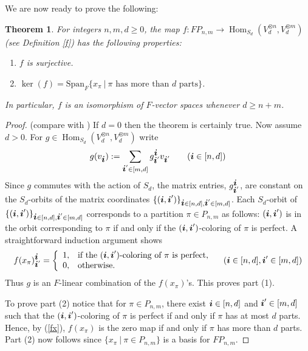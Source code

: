 \documentclass{amsart}
\def\bd#1{\mbox{\boldmath${#1}$}}
\newtheorem{theorem}{Theorem}[section]
\theoremstyle{definition}
\newcommand{\Hom}{\operatorname{Hom}}
\renewcommand{\1}{_{(1)}}
\renewcommand{\2}{_{(2)}}
\newcommand{\3}{_{(3)}}
\newcommand{\4}{_{(4)}}
\begin{document}
We are now ready to prove the following:

\begin{theorem}\label{sw}  For integers $n, m, d\geq 0$, the map $f: F P_{n,m}\to\Hom_{S_d}(V_d^{\otimes n}, V_d^{\otimes m})$ (see Definition \ref{f}) has the following properties:
\begin{enumerate}
\item[(1)] $f$ is surjective.

\item[(2)] $\ker(f)=\text{Span}_ F\{x_\pi~|~\pi\text{ has more than $d$ parts}\}$.  
\end{enumerate} 
In particular, $f$ is an isomorphism of $ F$-vector spaces whenever $d\geq n+m$.
\end{theorem}

\begin{proof} (compare with \cite[proof of Theorem 3.6(a)]{MR2143201})  If $d=0$ then the theorem is certainly true.  Now assume $d>0$.  For $g\in\Hom_{S_d}(V_d^{\otimes n}, V_d^{\otimes m})$ write $$g(v_{\bd{i}}):=\sum_{{\bd{i}}'\in[m, d]}g^{\bd{i}}_{{\bd{i}}'}v_{{\bd{i}}'}\qquad({\bd{i}}\in[n, d])$$  Since $g$ commutes with the action of $S_d$, the matrix entries, $g^{\bd{i}}_{{\bd{i}}'}$, are constant on the $S_d$-orbits of the matrix coordinates $\{({\bd{i}}, {\bd{i}}')\}_{{\bd{i}}\in[n,d], {\bd{i}}'\in[m,d]}$.  Each $S_d$-orbit of $\{({\bd{i}}, {\bd{i}}')\}_{{\bd{i}}\in[n,d], {\bd{i}}'\in[m,d]}$ corresponds to a partition $\pi\in P_{n,m}$ as follows: $({\bd{i}}, {\bd{i}}')$ is in the orbit corresponding to $\pi$ if and only if the $({\bd{i}}, {\bd{i}}')$-coloring of $\pi$ is perfect.  A straightforward induction argument shows 
 \begin{equation}\label{fx}
f(x_\pi)^{\bd{i}}_{{\bd{i}}'}=\left\{\begin{array}{ll}
1, & \text{if the $({\bd{i}}, {\bd{i}}')$-coloring of $\pi$ is perfect},\\
0, & \text{otherwise}.
\end{array}\right.\quad({\bd{i}}\in[n,d], {\bd{i}}'\in[m,d])
\end{equation}
Thus $g$ is an $ F$-linear combination of the $f(x_\pi)$'s.  This proves part (1).

To prove part (2) notice that for $\pi\in P_{n,m}$, there exist ${\bd{i}}\in[n, d]$ and ${\bd{i}}'\in[m, d]$ such that the $({\bd{i}}, {\bd{i}}')$-coloring of $\pi$ is perfect if and only if $\pi$ has at most $d$ parts.  Hence, by (\ref{fx}), $f(x_\pi)$ is the zero map if and only if $\pi$ has more than $d$ parts.  Part (2) now follows since $\{x_\pi~|~\pi\in P_{n,m}\}$ is a basis for $ F P_{n,m}$.
\end{proof}
\end{document}
